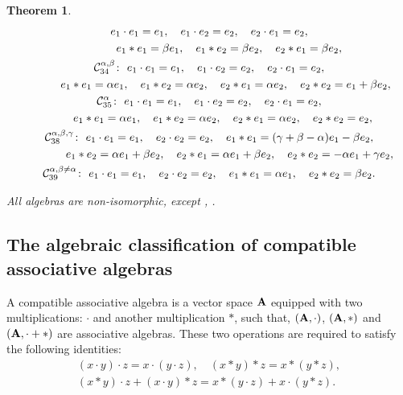 \documentclass[pdftex]{sigma}
\numberwithin{equation}{section}
\newtheorem{Theorem}{Theorem}[section]
\begin{document}
\begin{Theorem}
\begin{gather*}
 e_{1}\cdot e_{1}=e_{1} , \quad e_{1}\cdot e_{2}= e_{2} , \quad e_{2}\cdot
e_{1}=e_{2} , \\
\hphantom{\mathcal{C}_{32}^{1 ,\beta ,\beta } \colon} \
 e_{1}\ast e_{1}=\beta e_{1} , \quad e_{1}\ast e_{2}=\beta e_{2} , \quad
e_{2}\ast e_{1}=\beta e_{2},
 \\
 \mathcal{C}_{34}^{\alpha ,\beta } \colon\
 e_{1}\cdot e_{1}=e_{1} , \quad e_{1}\cdot e_{2}=e_{2} , \quad e_{2}\cdot
e_{1}=e_{2} , \\
\hphantom{\mathcal{C}_{34}^{\alpha ,\beta } \colon} \
 e_{1}\ast e_{1}=\alpha e_{1} , \quad e_{1}\ast e_{2}=\alpha e_{2} , \quad
e_{2}\ast e_{1}=\alpha e_{2} , \quad e_{2}\ast e_{2}=e_{1}+\beta e_{2},
 \\
 \mathcal{C}_{35}^{\alpha } \colon\
 e_{1}\cdot e_{1}=e_{1} , \quad e_{1}\cdot e_{2}=e_{2} , \quad e_{2}\cdot
e_{1}=e_{2} , \\
\hphantom{\mathcal{C}_{35}^{\alpha } \colon} \
 e_{1}\ast e_{1}=\alpha e_{1} , \quad e_{1}\ast e_{2}=\alpha e_{2} , \quad
e_{2}\ast e_{1}=\alpha e_{2} , \quad e_{2}\ast e_{2}=e_{2},
 \\
 \mathcal{C}_{38}^{\alpha ,\beta ,\gamma } \colon\
 e_{1}\cdot e_{1}=e_{1} , \quad e_{2}\cdot e_{2}=e_{2} , \quad
 e_{1}\ast e_{1}=( \gamma +\beta -\alpha ) e_{1}-\beta e_{2} ,\\
 \hphantom{\mathcal{C}_{38}^{\alpha ,\beta ,\gamma } \colon} \
e_{1}\ast e_{2}=\alpha e_{1}+\beta e_{2} , \quad
 e_{2}\ast e_{1}=\alpha
e_{1}+\beta e_{2} , \quad e_{2}\ast e_{2}=-\alpha e_{1}+\gamma e_{2},
 \\
 \mathcal{C}_{39}^{\alpha ,\beta \neq \alpha } \colon\
 e_{1}\cdot e_{1}=e_{1} ,\quad e_{2}\cdot e_{2}=e_{2} , \quad
 e_{1}\ast e_{1}=\alpha e_{1} , \quad e_{2}\ast e_{2}=\beta e_{2}.
\end{gather*}

All algebras are non-isomorphic, except
,
.
\end{Theorem}

\subsection{The algebraic classification of compatible associative algebras}

\begin{Definition}
A compatible associative algebra is a vector space ${\bf A}$ equipped with
two multiplications: $\cdot$ and another multiplication $\ast$,
such that, $({\bf A}, \cdot)$, $({\bf A}, \ast)$ and
$({\bf A}, \cdot+ \ast)$ are associative algebras.
These two operations are required to satisfy the following identities:
\begin{gather*}
( x\cdot y) \cdot z=x\cdot ( y\cdot
z),\quad
( x\ast y) \ast z=x\ast ( y\ast z),\\
(x\ast y)\cdot z+(x\cdot y)\ast z=
x\ast (y\cdot z)+x\cdot (y\ast z).
 \end{gather*}
 \end{Definition}
\end{document}
